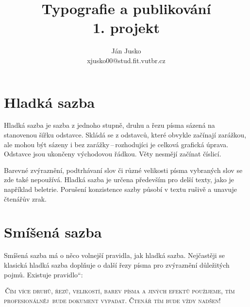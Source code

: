 \documentclass[a4paper,11pt,twocolumn]{article}
\begin{document}
\newcommand{\myuv}[1]{\quotedblbase #1\textquotedblleft} 

\title{Typografie a publikování\\
	1. projekt}
\date{}
\author{Ján Jusko\\
	xjusko00@stud.fit.vutbr.cz}

\maketitle

\section{Hladká sazba}

\noindent Hladká sazba je sazba z jednoho stupně, druhu a řezu písma sázená na stanovenou šířku odstavce.
Skládá se z odstavců, které obvykle začínají zarážkou, ale mo\-hou být sázeny i bez zarážky\,--\,rozhodujíci je celková
grafická úprava. Odstavce jsou ukončeny východovou řádkou. Věty nesmějí začínat číslicí.\par
Barevné zvýraznění, podtrhávaní slov či různé ve\-likosti písma vybraných slov se zde také nepoužívá. Hladká sazba je určena
především pro delší texty, jako je například beletrie. Porušení konzistence sazby působí v textu rušivě a unavuje čtenářův zrak.

\section {Smíšená sazba }

\noindent Smíšená sazba má o něco volnejší pravidla, jak hladká sazba. Nejčastěji se klasická hladká sazba doplňuje o další řezy písma
pro zvýraznění důležitých pojmů. Existuje \myuv{pravidlo}: \vspace{8pt}


{\addtolength{\leftskip}{7,5mm}
\addtolength{\rightskip}{7,5mm}
\textsc{\,Čím více druhů, řezů, velikostí, barev písma a jiných efektů použijeme, tím profesionálněj~bude dokument vypadat.
Čtenář tím bude vždy nadšen!}

}
\end{document}
